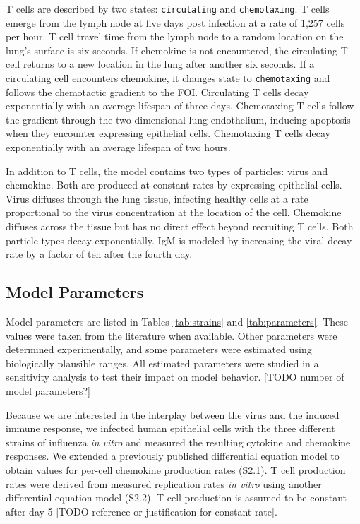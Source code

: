 \documentclass[10pt]{article}
\begin{document}
T cells are described by two states: \texttt{circulating} and \texttt{chemotaxing}.    T cells emerge from the lymph node at five days post infection at a rate of 1,257 cells per hour. T cell travel time from the lymph node to a random location on the lung's surface is six seconds.  If chemokine is not encountered, the circulating T cell returns to a new location in the lung after another six seconds.  If a circulating cell encounters chemokine, it changes state to \texttt{chemotaxing} and follows the chemotactic gradient to the FOI. Circulating T cells decay exponentially with an average lifespan of three days.  Chemotaxing T cells follow the gradient through the two-dimensional lung endothelium, inducing apoptosis when they encounter expressing epithelial cells. Chemotaxing T cells decay exponentially with an average lifespan of two hours.

In addition to T cells, the model contains two types of particles: virus and chemokine. Both are produced at constant rates by expressing epithelial cells.  Virus diffuses through the lung tissue, infecting healthy cells at a rate proportional to the virus concentration at the location of the cell. Chemokine diffuses across the tissue but has no direct effect beyond recruiting T cells. Both particle types decay exponentially.  IgM is modeled by increasing the viral decay rate by a factor of ten after the fourth day.


\subsection*{Model Parameters}

Model parameters are listed in Tables \ref{tab:strains} and \ref{tab:parameters}. These values were taken from the literature when available.  Other parameters were determined experimentally, and some parameters were estimated using biologically plausible ranges.  All estimated parameters were studied in a sensitivity analysis to test their impact on model behavior.  [TODO number of model parameters?]

Because we are interested in the interplay between the virus and the induced immune response, we infected human epithelial cells with the three different strains of influenza \textit{in vitro} and measured the resulting cytokine and chemokine responses.  We extended a previously published differential equation model \cite{Mitchell2011} to obtain values for per-cell chemokine production rates (S2.1).  T cell production rates were derived from measured replication rates \textit{in vitro} \cite{Miao2010} using another differential equation model (S2.2). T cell production is assumed to be constant after day 5 [TODO reference or justification for constant rate].  
\end{document}
